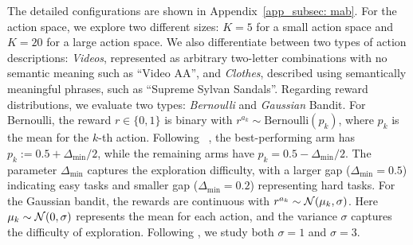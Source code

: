 The detailed configurations are shown in Appendix~\ref{app_subsec: mab}. 
For the action space, we explore two different sizes: $K=5$ for a small action space and $K=20$ for a large action space. We also differentiate between two types of action descriptions: \emph{Videos}, represented as arbitrary two-letter combinations with no semantic meaning such as ``Video AA'', and \emph{Clothes},  described using semantically meaningful phrases, such as ``Supreme Sylvan Sandals''. Regarding reward distributions, we evaluate two types: \emph{Bernoulli} and \emph{Gaussian} Bandit.
For Bernoulli, the reward $r \in \{0, 1\}$ is binary with $r^{a_k} \sim \text{Bernoulli}(p_k)$, where $p_k$ is the mean for the $k$-th action. Following ~\citet{krishnamurthy2024can}, the best-performing arm has $p_k:=0.5 + \Delta_{\min}/2$, while the remaining arms have $p_k = 0.5 - \Delta_{\min}/2$. The parameter $\Delta_{\min}$ captures the exploration difficulty, with a larger gap ($\Delta_{\min}=0.5$) indicating easy tasks and smaller gap ($\Delta_{\min}=0.2$) representing hard tasks. For the Gaussian bandit, the rewards are continuous with $r^{a_k} \sim {\mathcal{N}}(\mu_k, \sigma)$. Here $\mu_k \sim {\mathcal{N}}(0, \sigma)$ represents the mean for each action, and the variance $\sigma$ captures the difficulty of exploration. Following \citet{sutton2018reinforcement}, we study both $\sigma=1$ and $\sigma=3$.


